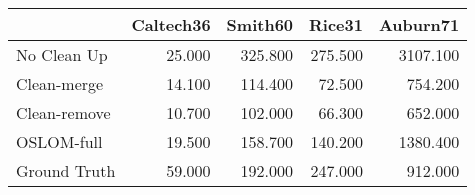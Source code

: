 \begin{tabular}{lrrrr}
\toprule
{} & Caltech36 & Smith60 &  Rice31 & Auburn71 \\
\midrule
No Clean Up  &    25.000 & 325.800 & 275.500 & 3107.100 \\
Clean-merge  &    14.100 & 114.400 &  72.500 &  754.200 \\
Clean-remove &    10.700 & 102.000 &  66.300 &  652.000 \\
OSLOM-full   &    19.500 & 158.700 & 140.200 & 1380.400 \\
Ground Truth &    59.000 & 192.000 & 247.000 &  912.000 \\
\bottomrule
\end{tabular}
